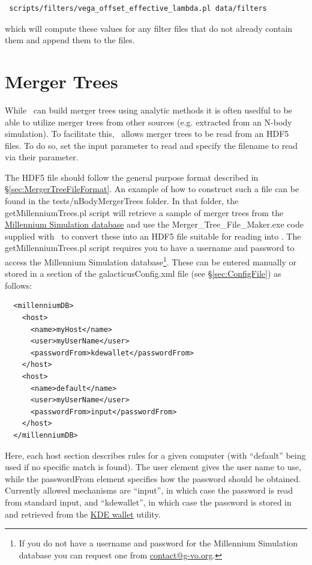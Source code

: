 \begin{verbatim}
 scripts/filters/vega_offset_effective_lambda.pl data/filters
\end{verbatim}
which will compute these values for any filter files that do not already contain them and append them to the files.

\section{Merger Trees}\label{sec:MergerTreeFiles}

While \glc\ can build merger trees using analytic methods it is often usedful to be able to utilize merger trees from other sources (e.g. extracted from an N-body simulation). To facilitate this, \glc\ allows merger trees to be read from an HDF5 files. To do so, set the {\normalfont \ttfamily [mergerTreeConstructMethod]} input parameter to {\normalfont \ttfamily read} and specify the filename to read via their {\normalfont \ttfamily [mergerTreeReadFileName]} parameter.

The HDF5 file should follow the general purpose format described in \S\ref{sec:MergerTreeFileFormat}. An example of how to construct such a file can be found in the {\normalfont \ttfamily tests/nBodyMergerTrees} folder. In that folder, the {\normalfont \ttfamily getMillenniumTrees.pl} script will retrieve a sample of merger trees from the \href{http://www.g-vo.org/MyMillennium3/}{Millennium Simulation database} and use the {\normalfont \ttfamily Merger\_Tree\_File\_Maker.exe} code supplied with \glc\ to convert these into an HDF5 file suitable for reading into \glc. The {\normalfont \ttfamily getMillenniumTrees.pl} script requires you to have a username and password to access the Millennium Simulation database\footnote{If you do not have a username and password for the Millennium Simulation database you can request one from \href{mailto:contact@g-vo.org}{\normalfont \ttfamily contact@g-vo.org}.}. These can be entered manually or stored in a section of the {\normalfont \ttfamily galacticusConfig.xml} file (see \S\ref{sec:ConfigFile}) as follows:
\begin{verbatim}
  <millenniumDB>
    <host>
      <name>myHost</name>
      <user>myUserName</user>
      <passwordFrom>kdewallet</passwordFrom>
    </host>
    <host>
      <name>default</name>
      <user>myUserName</user>
      <passwordFrom>input</passwordFrom>
    </host>
  </millenniumDB>
\end{verbatim}
Here, each {\normalfont \ttfamily host} section describes rules for a given computer (with ``default'' being used if no specific match is found). The {\normalfont \ttfamily user} element gives the user name to use, while the {\normalfont \ttfamily passwordFrom} element specifies how the password should be obtained. Currently allowed mechanisms are ``input'', in which case the password is read from standard input, and ``kdewallet'', in which case the password is stored in and retrieved from the \href{http://utils.kde.org/projects/kwalletmanager/}{KDE wallet} utility.

